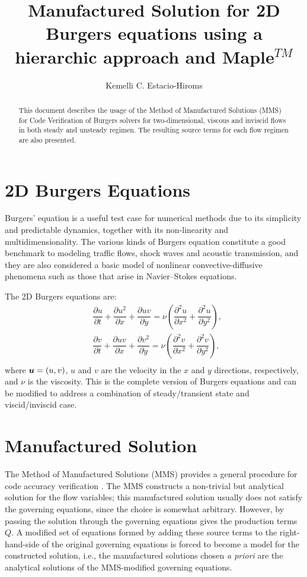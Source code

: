 \documentclass[10pt]{article}
\title{Manufactured Solution for 2D Burgers equations using a hierarchic approach and Maple$^{TM}$}
\author{Kemelli C. Estacio-Hiroms}
\newcommand{\diff}[2] {\dfrac{\partial #1}{\partial #2}}
\newcommand{\bv}[1]{\ensuremath{\mbox{\boldmath$ #1 $}}}
\begin{document}
\maketitle
\tableofcontents


\begin{abstract}
This document describes the usage of the Method of Manufactured Solutions (MMS) for Code Verification of Burgers solvers for two-dimensional, viscous and inviscid flows in both steady and unsteady regimen. The resulting source terms for each flow regimen are also presented.
\end{abstract}


\section{2D Burgers Equations}

Burgers' equation is a useful test case for numerical methods due to its simplicity and predictable dynamics, together with its non-linearity and multidimensionality. The various kinds of Burgers equation constitute a good benchmark to modeling traffic flows, shock waves and acoustic transmission, and they are also considered a basic model of nonlinear convective-diffusive phenomena such as those that arise
in Navier--Stokes equations.



The 2D Burgers  equations are:
\begin{equation}
 \label{eq:burgers2d_01}
\begin{split}
&\diff{ u}{t} + \diff{ u^2 }{x}+\diff{uv}{y}=\nu \left( \diff{^2u}{ x^2}+ \diff{^2u }{y^2}\right),\\
& \diff{ v}{t}+ \diff{ u v}{x} + \diff{  v^2 }{y}=\nu \left( \diff{^2v}{ x^2}+ \diff{^2v }{y^2}\right),\\
\end{split}
\end{equation}
%
where $\bv{u}=(u,v)$,  $u$ and $v$ are the velocity in the  $x$ and $y$  directions, respectively, and $\nu$ is the viscosity. This is the complete version of Burgers equations and can be modified to address a combination of steady/transient state and viscid/inviscid case.

\section{Manufactured Solution}
The Method of Manufactured Solutions (MMS) provides a general procedure for  code accuracy verification \cite{Roache2002,Bond2007}.
The MMS constructs a non-trivial but analytical solution for the flow variables; this manufactured
solution usually does not  satisfy the governing equations, since the choice is somewhat arbitrary. However, by passing the solution through the governing equations gives the production terms $Q$. A modified set of equations formed by adding these source terms to the right-hand-side of the original governing equations is forced to become a model for the constructed solution, i.e., the manufactured solutions chosen \textit{a priori} are the analytical solutions of the MMS-modified governing equations.
\end{document}
